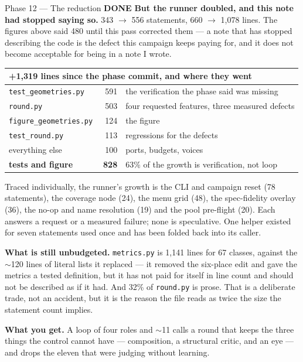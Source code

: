 \documentclass[11pt,a4paper]{article}
\newcommand{\code}[1]{\texttt{#1}}
\newcommand{\done}{\textcolor{good}{\textbf{DONE}}}
\begin{document}
\begin{phasebox}{Phase 12 --- The reduction \hfill \done}
\textbf{But the runner doubled, and this note had stopped saying so.} 343 $\to$ 556 statements,
660 $\to$ 1{,}078 lines. The figures above said 480 until this pass corrected them --- a note that has
stopped describing the code is the defect this campaign keeps paying for, and it does not become
acceptable for being in a note I wrote.

\begin{center}\small
\begin{tabular}{lrl}
\toprule
\multicolumn{3}{l}{\textbf{+1{,}319 lines since the phase commit, and where they went}} \\
\midrule
\code{test\_geometries.py}   & 591 & the verification the phase said was missing \\
\code{round.py}              & 503 & four requested features, three measured defects \\
\code{figure\_geometries.py} & 124 & the figure \\
\code{test\_round.py}        & 113 & regressions for the defects \\
everything else              &  ~100 & ports, budgets, voices \\
\midrule
\textbf{tests and figure}    & \textbf{828} & 63\% of the growth is verification, not loop \\
\bottomrule
\end{tabular}
\end{center}

\noindent Traced individually, the runner's growth is the CLI and campaign reset (78 statements), the
coverage node (24), the menu grid (48), the spec-fidelity overlay (36), the no-op and name resolution
(19) and the pool pre-flight (20). Each answers a request or a measured failure; none is speculative.
One helper existed for seven statements used once and has been folded back into its caller.

\textbf{What is still unbudgeted.} \code{metrics.py} is 1{,}141 lines for 67 classes, against the
$\sim$120 lines of literal lists it replaced --- it removed the six-place edit and gave the metrics a
tested definition, but it has not paid for itself in line count and should not be described as if it
had. And 32\% of \code{round.py} is prose. That is a deliberate trade, not an accident, but it is the
reason the file reads as twice the size the statement count implies.

\textbf{What you get.} A loop of four roles and $\sim$11 calls a round that keeps the three things the
control cannot have --- composition, a structural critic, and an eye --- and drops the eleven that
were judging without learning.
\end{phasebox}
\end{document}
